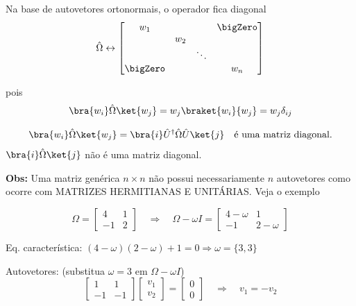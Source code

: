Na base de autovetores ortonormais, o operador fica diagonal
\begin{equation}
    \hat{\Omega} \leftrightarrow
    \begin{bmatrix}
    w_1 & & & \bigZero \\
    & w_2 & & \\
    & & \ddots & \\
    \bigZero & & & w_n
    \end{bmatrix}
\end{equation}

pois
\begin{equation}
    \bra{w_i}\hat{\Omega}\ket{w_j} = w_j \braket{w_i}{w_j} = w_j \delta_{ij}
\end{equation}

\begin{equation}
    \bra{w_i}\hat{\Omega}\ket{w_j} = \bra{i}\hat{U}^\dagger \hat{\Omega} \hat{U}\ket{j} \quad \text{é uma matriz diagonal.}
\end{equation}
$\bra{i}\hat{\Omega}\ket{j}$ não é uma matriz diagonal.

\textbf{Obs:} Uma matriz genérica $n \times n$ não possui necessariamente $n$ autovetores como ocorre com MATRIZES HERMITIANAS E UNITÁRIAS. Veja o exemplo

\begin{equation}
    \Omega = \begin{bmatrix} 4 & 1 \\ -1 & 2 \end{bmatrix}
    \quad \Longrightarrow \quad
    \Omega - \omega I = \begin{bmatrix} 4-\omega & 1 \\ -1 & 2-\omega \end{bmatrix}
\end{equation}

Eq. característica: $(4-\omega)(2-\omega) + 1 = 0 \Rightarrow \omega = \{3, 3\}$

Autovetores: (substitua $\omega = 3$ em $\Omega - \omega I$)
\begin{equation}
    \begin{bmatrix} 1 & 1 \\ -1 & -1 \end{bmatrix}
    \begin{bmatrix} v_1 \\ v_2 \end{bmatrix}
    =
    \begin{bmatrix} 0 \\ 0 \end{bmatrix}
    \quad \Longrightarrow \quad v_1 = -v_2
\end{equation}

